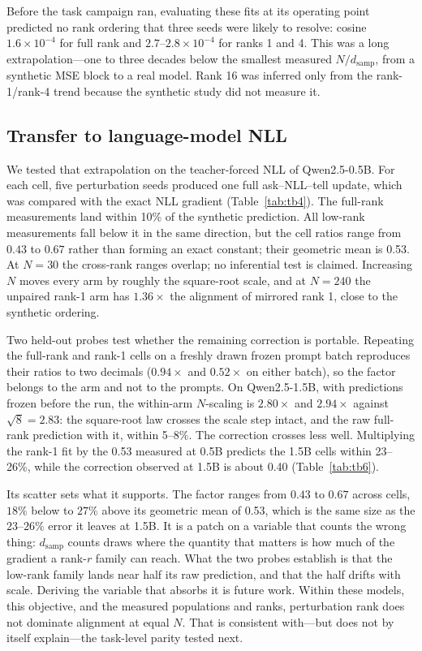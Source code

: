 Before the task campaign ran, evaluating these fits at its operating point
predicted no rank ordering that three seeds were likely to resolve: cosine
$1.6\times10^{-4}$ for full rank and $2.7$--$2.8\times10^{-4}$ for ranks 1
and 4. This was a long extrapolation---one to three decades below the smallest
measured $N/d_{\mathrm{samp}}$, from a synthetic MSE block to a real model.
Rank 16 was inferred only from the rank-1/rank-4 trend because the synthetic
study did not measure it.

\subsection{Transfer to language-model NLL}
We tested that extrapolation on the teacher-forced NLL of Qwen2.5-0.5B. For
each cell, five perturbation seeds produced one full ask--NLL--tell update,
which was compared with the exact NLL gradient (Table~\ref{tab:tb4}). The
full-rank measurements land within 10\% of the synthetic prediction. All
low-rank measurements fall below it in the same direction, but the cell ratios
range from $0.43$ to $0.67$ rather than forming an exact constant; their
geometric mean is 0.53. At $N{=}30$ the cross-rank ranges overlap; no
inferential test is claimed. Increasing $N$ moves every arm by roughly the square-root scale,
and at $N{=}240$ the unpaired rank-1 arm has $1.36\times$ the alignment of
mirrored rank 1, close to the synthetic ordering.

Two held-out probes test whether the remaining correction is portable.
Repeating the full-rank and rank-1 cells on a freshly drawn frozen prompt
batch reproduces their ratios to two decimals ($0.94\times$ and
$0.52\times$ on either batch), so the factor belongs to the arm and not to
the prompts. On Qwen2.5-1.5B, with predictions frozen before the run, the
within-arm $N$-scaling is $2.80\times$ and $2.94\times$ against
$\sqrt{8}=2.83$: the square-root law crosses the scale step intact, and the
raw full-rank prediction with it, within 5--8\%. The correction crosses less
well. Multiplying the rank-1 fit by the 0.53 measured at 0.5B predicts the
1.5B cells within 23--26\%, while the correction observed at 1.5B is about
0.40 (Table~\ref{tab:tb6}).

Its scatter sets what it supports. The factor ranges from $0.43$ to $0.67$
across cells, $18\%$ below to $27\%$ above its geometric mean of 0.53, which
is the same size as the $23$--$26\%$ error it leaves at 1.5B. It is a patch
on a variable that counts the wrong thing: $d_{\mathrm{samp}}$ counts draws
where the quantity that matters is how much of the gradient a rank-$r$
family can reach. What the two probes establish is that the low-rank family
lands near half its raw prediction, and that the half drifts with scale.
Deriving the variable that absorbs it is future work. Within these models, this objective, and the measured
populations and ranks, perturbation rank does not dominate alignment at equal
$N$. That is consistent with---but does not by itself explain---the task-level
parity tested next.

